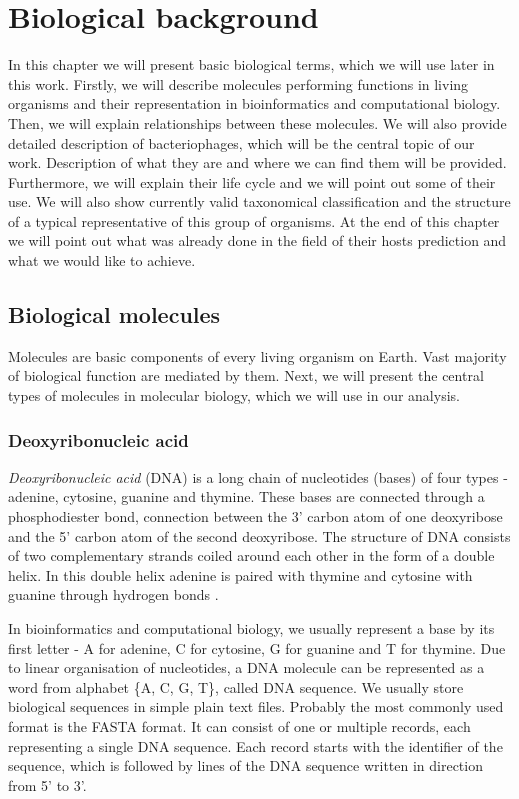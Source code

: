 \chapter{Biological background}
In this chapter we will present basic biological terms, which we will use later in this work.
Firstly, we will describe molecules performing functions in living organisms and their representation in bioinformatics and computational biology.
Then, we will explain relationships between these molecules.
We will also provide detailed description of bacteriophages, which will be the central topic of our work.
Description of what they are and where we can find them will be provided.
Furthermore, we will explain their life cycle and we will point out some of their use.
We will also show currently valid taxonomical classification and the structure of a typical representative of this group of organisms.
At the end of this chapter we will point out what was already done in the field of their hosts prediction and what we would like to achieve.

\section{Biological molecules}
Molecules are basic components of every living organism on Earth.
Vast majority of biological function are mediated by them.
Next, we will present the central types of molecules in molecular biology, which we will use in our analysis.

\subsection{Deoxyribonucleic acid}
\emph{Deoxyribonucleic acid} (DNA) is a long chain of nucleotides (bases) of four types - adenine, cytosine, guanine and thymine.
These bases are connected through a phosphodiester bond, connection between the 3' carbon atom of one deoxyribose and the 5' carbon atom of the second deoxyribose.
The structure of DNA consists of two complementary strands coiled around each other in the form of a double helix.
In this double helix adenine is paired with thymine and cytosine with guanine through hydrogen bonds \cite{molbio}.

In bioinformatics and computational biology, we usually represent a base by its first letter - A for adenine, C for cytosine, G for guanine and T for thymine.
Due to linear organisation of nucleotides, a DNA molecule can be represented as a word from alphabet \{A, C, G, T\}, called DNA sequence. We usually store biological sequences in simple plain text files.
Probably the most commonly used format is the FASTA format.
It can consist of one or multiple records, each representing a single DNA sequence.
Each record starts with the identifier of the sequence, which is followed by lines of the DNA sequence written in direction from 5' to 3'.

